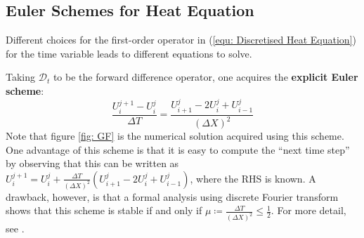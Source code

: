 \documentclass[../dissertation.tex]{subfiles}
\begin{document}
\subsection{Euler Schemes for Heat Equation}
Different choices for the first-order operator in (\ref{equ: Discretised Heat Equation}) for the time variable leads to different equations to solve.

Taking $\mathcal{D}_t$ to be the forward difference operator, one acquires the \textbf{explicit Euler scheme}:
\begin{equation}
    \frac{U_{i}^{j+1} - U_{i}^j}{\Delta T} = \frac{U_{i+1}^j - 2 U_{i}^{j} + U_{i-1}^j}{\left( \Delta X \right)^2}
\end{equation}
Note that figure \ref{fig: GF} is the numerical solution acquired using this scheme.
One advantage of this scheme is that it is easy to compute the ``next time step'' by observing that this can be written as $U_{i}^{j+1} = U_{i}^j + \frac{\Delta T}{\left( \Delta X \right)^2} \left( U_{i+1}^j - 2 U_{i}^j + U_{i-1}^{j} \right)$,
where the RHS is known.
A drawback, however, is that a formal analysis using discrete Fourier transform shows that this scheme is stable if and only if $\mu \coloneqq \frac{\Delta T}{\left( \Delta X \right)^2} \leq \frac{1}{2}$.
For more detail, see \cite{nspde}.
\end{document}
